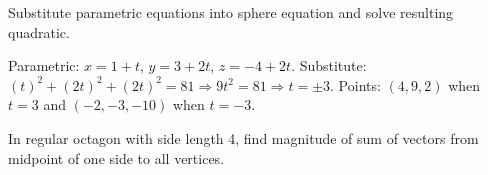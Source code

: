 \begin{hint}
Substitute parametric equations into sphere equation and solve resulting quadratic.
\end{hint}

\begin{solution}[Sketch]
Parametric: $x = 1+t$, $y = 3+2t$, $z = -4+2t$. Substitute: $(t)^2 + (2t)^2 + (2t)^2 = 81 \Rightarrow 9t^2 = 81 \Rightarrow t = \pm 3$. Points: $(4, 9, 2)$ when $t=3$ and $(-2, -3, -10)$ when $t=-3$.
\end{solution}

\vspace{1em}

\begin{problem}
In regular octagon with side length 4, find magnitude of sum of vectors from midpoint of one side to all vertices.
\end{problem}

